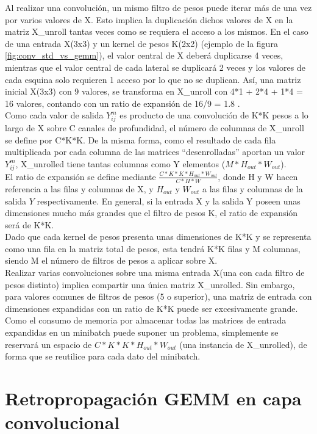 Al realizar una convolución, un mismo filtro de pesos puede iterar más de una vez por varios valores de X. Esto implica la duplicación dichos valores de X en la matriz X\_unroll tantas veces como se requiera el acceso a los mismos. En el caso de una entrada X(3x3) y un kernel de pesos K(2x2) (ejemplo de la figura \ref{fig:conv_std_vs_gemm}), el valor central de X deberá duplicarse 4 veces, mientras que el valor central de cada lateral se duplicará 2 veces y los valores de cada esquina solo requieren 1 acceso por lo que no  se duplican. Así, una matriz inicial X(3x3) con 9 valores, se transforma en X\_unroll con 4*1 + 2*4 + 1*4 = 16 valores, contando con un ratio de expansión de 16/9 = 1.8 . \\
 Como cada valor de salida $Y^m_{ij}$ es producto de una convolución de K*K pesos a lo largo de X sobre C canales de profundidad, el número de columnas de X\_unroll se define por C*K*K. De la misma forma, como el resultado de cada fila multiplicada por cada columna de las matrices ``desenrolladas'' aportan un valor $Y^m_{ij}$, X\_unrolled tiene tantas columnas como Y elementos ($M*H_{out}*W_{out}$). \\
 El ratio de expansión se define mediante $\frac{C*K*K*H_{out}*W_{out}}{C*H*W}$, donde H y W hacen referencia a las filas y columnas de X, y $H_{out}$ y $W_{out}$ a las filas y columnas de la salida $Y$ respectivamente. En general, si la entrada X y la salida Y poseen unas dimensiones mucho más grandes que el filtro de pesos K, el ratio de expansión será de K*K. \\
 Dado que cada kernel de pesos presenta unas dimensiones de K*K y se representa como una fila en la matriz total de pesos, esta tendrá K*K filas y M columnas, siendo M el número de filtros de pesos a aplicar sobre X. \\
 Realizar varias convoluciones sobre una misma entrada X(una con cada filtro de pesos distinto) implica compartir una única matriz X\_unrolled. Sin embargo, para valores comunes de filtros de pesos (5 o superior), una matriz de entrada con dimensiones expandidas con un ratio de K*K puede ser excesivamente grande. Como el consumo de memoria por almacenar todas las matrices de entrada expandidas en un minibatch puede suponer un problema, simplemente se reservará un espacio de $C*K*K*H_{out}*W_{out}$ (una instancia de X\_unrolled), de forma que se reutilice para cada dato del minibatch. \cite{Programming_Massively}

\section{Retropropagación GEMM en capa convolucional}

